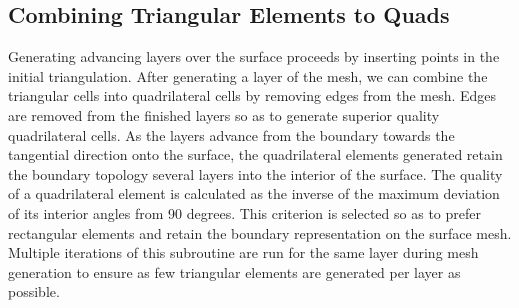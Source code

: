 \documentclass[conf]{new-aiaa}
\begin{document}
\subsection{Combining Triangular Elements to Quads}

Generating advancing layers over the surface proceeds by inserting points in the initial triangulation. After generating a layer of the mesh, we can combine the triangular cells into quadrilateral cells by removing edges from the mesh. Edges are removed from the finished layers so as to generate superior quality quadrilateral cells. As the layers advance from the boundary towards the tangential direction onto the surface, the quadrilateral elements generated retain the boundary topology several layers into the interior of the surface. The quality of a quadrilateral element is calculated as the inverse of the maximum deviation of its interior angles from 90 degrees. This criterion is selected so as to prefer rectangular elements and retain the boundary representation on the surface mesh. Multiple iterations of this subroutine are run for the same layer during mesh generation to ensure as few triangular elements are generated per layer as possible.
\end{document}
